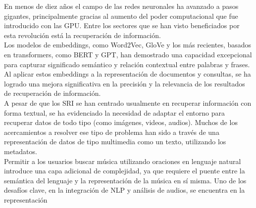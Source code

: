 En menos de diez años el campo de las redes neuronales ha avanzado a pasos gigantes, principalmente gracias al 
aumento del poder computacional que fue introducido con las GPU. Entre los sectores que se han visto beneficiados por 
esta revolución está la recuperación de información. \\ %
Los modelos de embeddings, como Word2Vec, GloVe y los más recientes, basados en transformers, como BERT y GPT, %
han demostrado una capacidad excepcional para capturar significado semántico y relación contextual entre palabras 
y frases. Al aplicar estos embeddings a la representación de documentos y consultas, se ha logrado una mejora 
significativa en la precisión y la relevancia de los resultados de recuperación de información.\\ %
A pesar de que los SRI se han centrado usualmente en recuperar información con forma textual, se ha evidenciado 
la necesidad de adaptar el entorno para recuperar datos de todo tipo (como imágenes, videos, audios). Muchos de 
los acercamientos a resolver ese tipo de problema han sido a través de una representación de datos de tipo multimedia 
como un texto, utilizando los metadatos. \\%
Permitir a los usuarios buscar música utilizando oraciones en lenguaje natural introduce una capa adicional de 
complejidad, ya que requiere el puente entre la semántica del lenguaje y la representación de la música en sí misma.
Uno de los desafíos clave, en la integración de NLP y análisis de audios, se encuentra en la representación 
